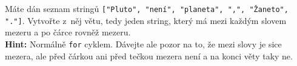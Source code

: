 \question[50]
Máte dán seznam stringů \texttt{["Pluto", "není", "planeta", ",", "Žaneto",
			"."]}. Vytvořte z~něj větu, tedy jeden string, který má mezi každým slovem
mezeru a po čárce rovněž mezeru.\\
\textbf{Hint:} Normálně \texttt{for} cyklem. Dávejte ale pozor na to, že mezi
slovy je sice mezera, ale před čárkou ani před tečkou mezera není a na konci
věty taky ne.
